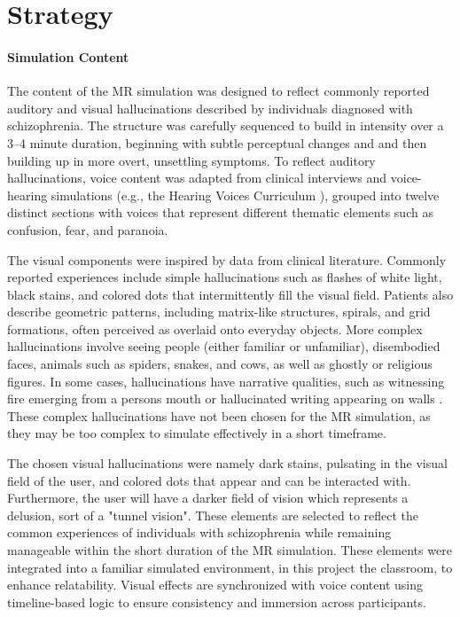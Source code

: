 \section{Strategy}

\paragraph{Simulation Content} The content of the MR simulation was designed to reflect commonly reported auditory and visual hallucinations described by individuals diagnosed with schizophrenia. The structure was carefully sequenced to build in intensity over a 3--4 minute duration, beginning with subtle perceptual changes and and then building up in more overt, unsettling symptoms. To reflect auditory hallucinations, voice content was adapted from clinical interviews and voice-hearing simulations (e.g., the Hearing Voices Curriculum \cite{Chaffin2013}), grouped into twelve distinct sections with voices that represent different thematic elements such as confusion, fear, and paranoia.

\vspace{1em}

The visual components were inspired by data from clinical literature. Commonly reported experiences include simple hallucinations such as flashes of white light, black stains, and colored dots that intermittently fill the visual field. Patients also describe geometric patterns, including matrix-like structures, spirals, and grid formations, often perceived as overlaid onto everyday objects. More complex hallucinations involve seeing people (either familiar or unfamiliar), disembodied faces, animals such as spiders, snakes, and cows, as well as ghostly or religious figures. In some cases, hallucinations have narrative qualities, such as witnessing fire emerging from a persons mouth or hallucinated writing appearing on walls \cite{Vanommen2019,Silverstein2021}. These complex hallucinations have not been chosen for the MR simulation, as they may be too complex to simulate effectively in a short timeframe.

\vspace{1em}

The chosen visual hallucinations were namely dark stains, pulsating in the visual field of the user, and colored dots that appear and can be interacted with. Furthermore, the user will have a darker field of vision which represents a delusion, sort of a "tunnel vision". These elements are selected to reflect the common experiences of individuals with schizophrenia while remaining manageable within the short duration of the MR simulation.  These elements were integrated into a familiar simulated environment, in this project the classroom, to enhance relatability. Visual effects are synchronized with voice content using timeline-based logic to ensure consistency and immersion across participants.

